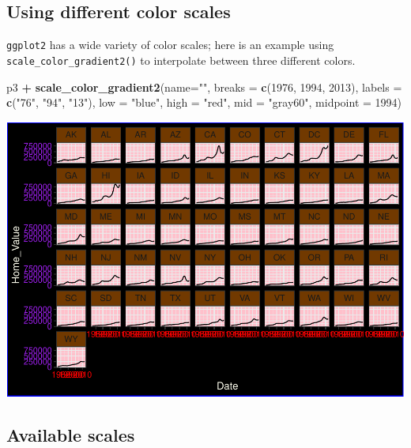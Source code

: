 \documentclass[
]{book}
\newenvironment{Shaded}{\begin{snugshade}}{\end{snugshade}}
\newcommand{\DataTypeTok}[1]{\textcolor[rgb]{0.13,0.29,0.53}{#1}}
\newcommand{\DecValTok}[1]{\textcolor[rgb]{0.00,0.00,0.81}{#1}}
\newcommand{\KeywordTok}[1]{\textcolor[rgb]{0.13,0.29,0.53}{\textbf{#1}}}
\newcommand{\NormalTok}[1]{#1}
\newcommand{\OperatorTok}[1]{\textcolor[rgb]{0.81,0.36,0.00}{\textbf{#1}}}
\newcommand{\StringTok}[1]{\textcolor[rgb]{0.31,0.60,0.02}{#1}}
\begin{document}
\hypertarget{using-different-color-scales}{%
\subsection{Using different color scales}\label{using-different-color-scales}}

\texttt{ggplot2} has a wide variety of color scales; here is an example using \texttt{scale\_color\_gradient2()} to interpolate between three different colors.

\begin{Shaded}
\begin{Highlighting}[]
\NormalTok{p3 }\OperatorTok{+}
\StringTok{  }\KeywordTok{scale\_color\_gradient2}\NormalTok{(}\DataTypeTok{name=}\StringTok{""}\NormalTok{,}
                        \DataTypeTok{breaks =} \KeywordTok{c}\NormalTok{(}\DecValTok{1976}\NormalTok{, }\DecValTok{1994}\NormalTok{, }\DecValTok{2013}\NormalTok{),}
                        \DataTypeTok{labels =} \KeywordTok{c}\NormalTok{(}\StringTok{"\textquotesingle{}76"}\NormalTok{, }\StringTok{"\textquotesingle{}94"}\NormalTok{, }\StringTok{"\textquotesingle{}13"}\NormalTok{),}
                        \DataTypeTok{low =} \StringTok{"blue"}\NormalTok{,}
                        \DataTypeTok{high =} \StringTok{"red"}\NormalTok{,}
                        \DataTypeTok{mid =} \StringTok{"gray60"}\NormalTok{,}
                        \DataTypeTok{midpoint =} \DecValTok{1994}\NormalTok{)}
\end{Highlighting}
\end{Shaded}

\includegraphics{R/Rgraphics/figures/unnamed-chunk-186-1.pdf}

\hypertarget{available-scales}{%
\subsection{Available scales}\label{available-scales}}
\end{document}
